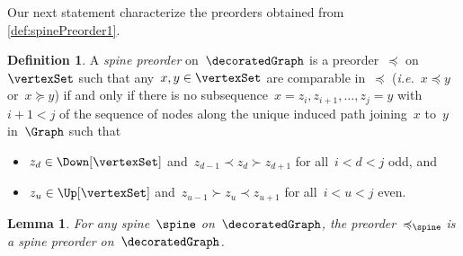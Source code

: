 \documentclass{amsart}
\newtheorem{lemma}[theorem]{Lemma}
\theoremstyle{definition}
\newtheorem{definition}[theorem]{Definition}
\newcommand{\ie}{\textit{i.e.}~} %
\newcommand{\darkblue}{\color{darkblue}} %
\newcommand{\defn}[1]{\textsl{\darkblue #1}} %
\begin{document}
Our next statement characterize the preorders obtained from \cref{def:spinePreorder1}.

\begin{definition}
  \label{def:spinePreorder2}
  A \defn{spine preorder} on~$\decoratedGraph$ is a preorder~$\preccurlyeq$ on~$\vertexSet$ such that any~$x,y \in \vertexSet$ are comparable in~$\preccurlyeq$ (\ie $x \preccurlyeq y$ or~$x \succcurlyeq y$) if and only if there is no subsequence~$x = z_i, z_{i+1}, \dots, z_j = y$ with~$i + 1 < j$ of the sequence of nodes along the unique induced path joining~$x$ to~$y$ in~$\Graph$ such that
  \begin{itemize}
    \item $z_d \in \Down[\vertexSet]$ and~$z_{d-1} \prec z_d \succ z_{d+1}$ for all~$i < d < j$ odd, and
    \item $z_u \in \Up[\vertexSet]$ and~$z_{u-1} \succ z_u \prec z_{u+1}$ for all~$i < u < j$ even.
  \end{itemize}
\end{definition}

\begin{lemma}
  \label{lem:spinePreorder1}
  For any spine~$\spine$ on~$\decoratedGraph$, the preorder~$\preccurlyeq_{\spine}$ is a spine preorder on~$\decoratedGraph$.
\end{lemma}
\end{document}
